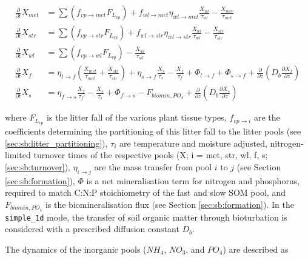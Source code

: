 \begin{subequations}\label{eq:sb:simple_om_dynamics}
\begin{align}
\frac{\partial}{\partial t} X_{met} &= \sum(f_{vp \rightarrow met} F_{L_{vp}}) + f_{wl \rightarrow met} \eta_{wl \rightarrow met} \frac{X_{wl}}{\tau_{wl}} - \frac{X_{met}}{\tau_{met}}\\
\frac{\partial}{\partial t} X_{str} &= \sum(f_{vp \rightarrow str} F_{L_{vp}}) + f_{wl \rightarrow str} \eta_{wl \rightarrow str} \frac{X_{wl}}{\tau_{wl}}- \frac{X_{str}}{\tau_{str}}\\
\frac{\partial}{\partial t} X_{wl} &= \sum(f_{vp \rightarrow wl} F_{L_{vp}}) - \frac{X_{wl}}{\tau_{wl}}\\
\frac{\partial}{\partial t} X_{f} &= \eta_{l \rightarrow f} (\frac{X_{met}}{\tau_{met}} + \frac{X_{str}}{\tau_{str}}) + \eta_{s \rightarrow f} \frac{X_{s}}{\tau_{s}} - \frac{X_{f}}{\tau_{f}} + \Phi_{l \rightarrow f} + \Phi_{s \rightarrow f} + \frac{\partial}{\partial z} (D_b \frac{\partial X_{f}}{\partial z}) \\
\frac{\partial}{\partial t} X_{s} &= \eta_{f \rightarrow s} \frac{X_{f}}{\tau_{f}} - \frac{X_{s}}{\tau_{s}}  + \Phi_{f \rightarrow s} - F_{biomin,PO_4} + \frac{\partial}{\partial z} (D_b \frac{\partial X_{s}}{\partial z})
\end{align}
\end{subequations}

where $F_{L_{vp}}$ is the litter fall of the various plant tissue types, $f_{vp \rightarrow i}$ are the coefficients determining the partitioning of this litter fall to the litter pools (see \ref{sec:sb:litter_partitioning}), $\tau_i$ are temperature and moisture adjusted, nitrogen-limited turnover times of the respective pools (X; i = met, str, wl, f, s; \ref{sec:sb:turnover}), $\eta_{i \rightarrow j }$ are the mass transfer from pool $i$ to $j$ (see Section \ref{sec:sb:formation}), $\Phi$ is a net mineralisation term for nitrogen and phosphorus, required to match C:N:P stoichiometry of the fast and slow SOM pool, and $F_{biomin,PO_4}$ is the biomineralisation flux (see Section \ref{sec:sb:formation}). In the \texttt{simple\_1d} mode, the transfer of soil organic matter through bioturbation is considered with a prescribed diffusion constant $D_b$.

The dynamics of the inorganic pools ($NH_4$, $NO_3$, and $PO_4$) are described as 

